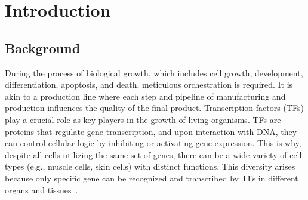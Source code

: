 \documentclass{PHlab-thesis}
\begin{document}
\renewcommand\nomgroup[1]{%
  \item[\bfseries
  \ifstrequal{#1}{A}{General}{%
  \ifstrequal{#1}{Z}{Gene/Protein Names}%
  }]}





\printnomenclature[5cm]

\newpage
\setcounter{page}{1}


\chapter{Introduction}
\section{Background}
During the process of biological growth, which includes cell growth, development, differentiation, apoptosis, and death, meticulous orchestration is required. It is akin to a production line where each step and pipeline of manufacturing and production influences the quality of the final product. Transcription factors (TFs) play a crucial role as key players in the growth of living organisms. TFs are proteins that regulate gene transcription, and upon interaction with DNA, they can control cellular logic by inhibiting or activating gene expression. This is why, despite all cells utilizing the same set of genes, there can be a wide variety of cell types (e.g., muscle cells, skin cells) with distinct functions. This diversity arises because only specific gene can be recognized and transcribed by TFs in different organs and tissues~\cite{lambert2018human}.
\end{document}
